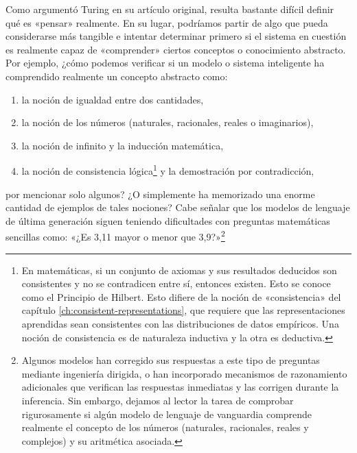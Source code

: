 \documentclass[../../book-main_es.tex]{subfiles}
\begin{document}
Como argumentó Turing en su artículo original, resulta bastante difícil
definir qué es «pensar» realmente. En su lugar, podríamos partir de algo que pueda considerarse más
tangible e intentar determinar primero si el sistema en cuestión es realmente capaz de
«comprender» ciertos conceptos o conocimiento abstracto. Por ejemplo, ¿cómo podemos
verificar si un modelo o sistema inteligente ha comprendido realmente
un concepto abstracto como: 
\begin{enumerate}
    \item la noción de igualdad entre dos cantidades,
    \item la noción de los números (naturales, racionales, reales o imaginarios),
    \item la noción de infinito y la inducción matemática,
    \item la noción de consistencia lógica\footnote{En matemáticas, si un conjunto de axiomas y sus resultados deducidos son consistentes y
        no se contradicen entre sí, entonces existen. Esto se conoce como el Principio de Hilbert. Esto difiere de la
        noción de «consistencia» del capítulo \ref{ch:consistent-representations}, que requiere que las representaciones aprendidas
        sean consistentes con las distribuciones de datos empíricos. Una noción de consistencia es de naturaleza inductiva
    y la otra es deductiva.} y la demostración por contradicción,
\end{enumerate}
por mencionar solo algunos? ¿O simplemente ha memorizado una enorme cantidad de
ejemplos de tales nociones? Cabe señalar que los modelos de lenguaje de última generación
siguen teniendo dificultades con preguntas matemáticas sencillas como: «¿Es
3,11 mayor o menor que 3,9?»\footnote{Algunos modelos han
    corregido sus respuestas a este tipo de preguntas mediante
    ingeniería dirigida, o han incorporado mecanismos de razonamiento adicionales
    que verifican las respuestas inmediatas y las corrigen durante la inferencia.
    Sin embargo, dejamos al lector la tarea de comprobar rigurosamente
    si algún modelo de lenguaje de vanguardia comprende realmente el
    concepto de los números (naturales, racionales, reales y complejos) y su
    aritmética asociada.}
\end{document}
